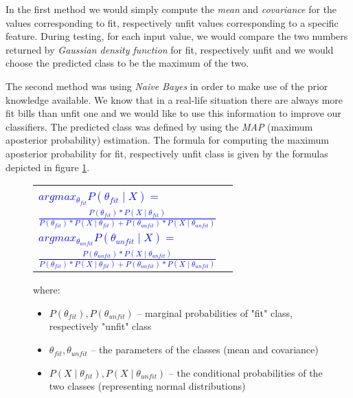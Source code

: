 \documentclass[11pt,twocolumn]{article}
\begin{document}
			In the first method we would simply compute the \emph{mean} and \emph{covariance} for the values corresponding to fit, respectively unfit values corresponding to a specific feature. During testing, for each input value, we would compare the two numbers returned by \emph{Gaussian density function} for fit, respectively unfit and we would choose the predicted class to be the maximum of the two.

			The second method was using \emph{Naive Bayes} in order to make use of the prior knowledge available. We know that in a real-life situation there are always more fit bills than unfit one and we would like to use this information to improve our classifiers. The predicted class was defined by using the \emph{MAP} (maximum aposterior probability) estimation. The formula for computing the maximum aposterior probability for fit, respectively unfit class is given by the formulas depicted in figure \ref{MAP_formula}.

			\begin{figure}[!hbtp] \selectfont\small
				\caption{}
				\begin{tabular}{|lr|} \hline
					&\\[5pt]
					\textcolor{blue}{$argmax_{\theta_{fit}}P(\theta_{fit}\mid X) = $} &\\[5pt]
					\hspace*{50px}\textcolor{blue}{$\frac{P(\theta_{fit})*P(X\mid \theta_{fit})}{P(\theta_{fit})*P(X\mid \theta_{fit}) + P(\theta_{unfit})*P(X\mid \theta_{unfit})}$} &\\[15pt]
					\textcolor{blue}{$argmax_{\theta_{unfit}}P(\theta_{unfit}\mid X) = $} &\\[5pt]
					\hspace*{50px}\textcolor{blue}{$\frac{P(\theta_{unfit})*P(X\mid \theta_{unfit})}{P(\theta_{fit})*P(X\mid \theta_{fit}) + P(\theta_{unfit})*P(X\mid \theta_{unfit})}$} &\\[10pt]
			\hline
			\end{tabular}
					where: 
					\begin{itemize}
					\item $P(\theta_{fit}), P(\theta_{unfit})$ -- marginal probabilities of
						"fit" class, respectively "unfit" class
					\item $\theta_{fit}, \theta_{unfit}$ -- the parameters of the classes (mean
						and covariance)
					\item $P(X\mid \theta_{fit}),P(X\mid \theta_{unfit})$ -- the conditional
						probabilities of the two classes (representing normal distributions)
					\end{itemize} 
			\label{MAP_formula}
			\end{figure}
\end{document}
